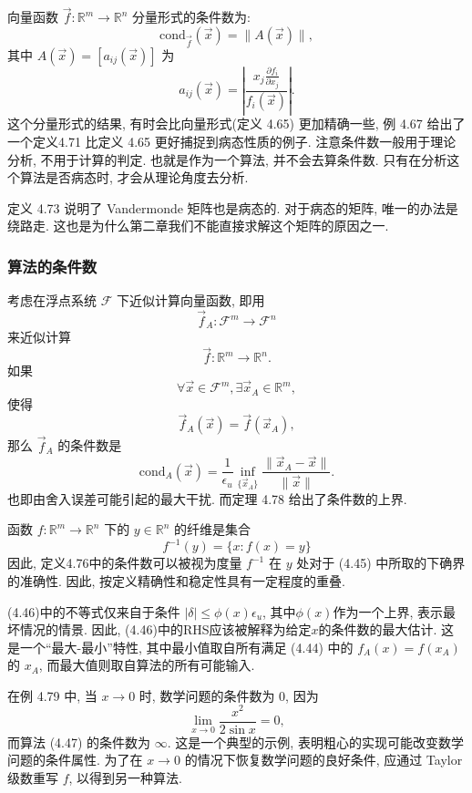 \documentclass[a4paper]{ctexart}
\begin{document}
{ 向量函数 $\vec{f}: \mathbb{R}^m \to \mathbb{R}^n$
分量形式的条件数为:
$$
\mbox{cond}_{\vec{f}}(\vec{x}) = \|A(\vec{x})\|,
$$
其中 $A(\vec{x}) = [a_{ij}(\vec{x})]$ 为
$$
a_{ij}(\vec{x})
= \left|\frac{x_j\frac{\partial f_i}{\partial x_j}}{f_i(\vec{x})}\right|.
$$
这个分量形式的结果, 有时会比向量形式(定义 4.65) 更加精确一些, 例 4.67 给出了一个定义4.71 
比定义 4.65 更好捕捉到病态性质的例子. 注意条件数一般用于理论分析, 
不用于计算的判定. 也就是作为一个算法, 并不会去算条件数. 只有在分析这个算法是否病态时, 
才会从理论角度去分析.

定义 4.73 说明了 Vandermonde
矩阵也是病态的. 对于病态的矩阵, 唯一的办法是绕路走. 
这也是为什么第二章我们不能直接求解这个矩阵的原因之一.

\subsubsection{算法的条件数}

 考虑在浮点系统 $\mathscr{F}$ 下近似计算向量函数,
即用
$$
\vec{f}_A : \mathscr{F}^m \to \mathscr{F}^n
$$
来近似计算
$$
\vec{f} : \mathbb{R}^m \to \mathbb{R}^n.
$$
如果
$$
\forall \vec{x} \in \mathscr{F}^m, \exists \vec{x}_A \in \mathbb{R}^m,
$$
使得
$$
\vec{f}_A(\vec{x}) = \vec{f}(\vec{x}_A),
$$
那么 $\vec{f}_A$ 的条件数是
$$
\mbox{cond}_A (\vec{x}) = \frac{1}{\epsilon_u}
\inf_{\{\vec{x}_A\}}\frac{\|\vec{x}_A - \vec{x}\|}{\|\vec{x}\|}.
$$
也即由舍入误差可能引起的最大干扰. 而定理 4.78 给出了条件数的上界.

\begin{remark}

  函数 $f : \mathbb{R}^m \rightarrow \mathbb{R}^n$ 下的 $y \in \mathbb{R}^n$ 的纤维是集合
\[f^{-1}(y) = \{x : f(x) = y\}\]
因此, 定义4.76中的条件数可以被视为度量 $f^{-1}$ 在 $y$ 处对于 (4.45) 中所取的下确界的准确性. 
因此, 按定义精确性和稳定性具有一定程度的重叠.

(4.46)中的不等式仅来自于条件 $|\delta| \leq \phi(x)\epsilon_u$,
其中$\phi(x)$作为一个上界, 表示最坏情况的情景. 因此, (4.46)中的RHS应该被解释为给定$x$的条件数的最大估计. 
这是一个``最大-最小''特性, 其中最小值取自所有满足 (4.44) 中的 $f_A(x) = f(x_A)$ 的 $x_A$, 
而最大值则取自算法的所有可能输入. 

在例 4.79 中, 当 $x \rightarrow 0$ 时, 数学问题的条件数为 $0$, 
因为 
$$
\lim_{x\rightarrow0} \frac{x^2}{2\sin x} = 0,
$$
而算法 (4.47) 的条件数为 $\infty$. 这是一个典型的示例, 表明粗心的实现可能改变数学问题的条件属性. 
为了在 $x \rightarrow 0$ 的情况下恢复数学问题的良好条件, 应通过 Taylor 级数重写 $f$, 以得到另一种算法.
\end{remark}

}
\end{document}
